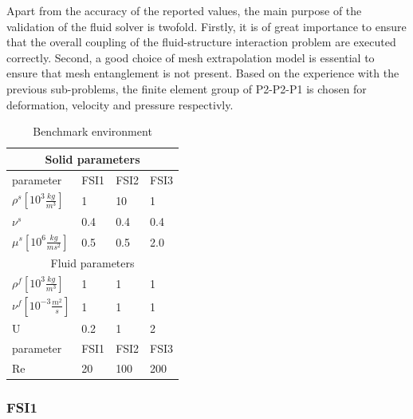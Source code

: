 Apart from the accuracy of the reported values, the main purpose of the validation of the fluid solver is twofold. Firstly, it is of great importance to ensure that the overall coupling of the fluid-structure interaction problem are executed correctly. Second, a good choice of mesh extrapolation model is essential to ensure that mesh entanglement is not present. Based on the experience with the previous sub-problems, the finite element group of P2-P2-P1 is chosen for deformation, velocity and pressure respectivly. 


\begin{table}[h!]
\centering
\caption{Benchmark environment}
\label{my-label}
\begin{tabular}{ |p{3cm}||p{2cm}|p{2cm}|p{2cm}|  }
 \hline
 \multicolumn{4}{|c|}{Solid parameters} \\
 \hline
 parameter              & FSI1 & FSI2 & FSI3 \\
 \hline
 $\rho^s [10^{3} \frac{kg}{m^3}]$ & 1    & 10   & 1    \\
$\nu^s$ & 0.4  & 0.4  & 0.4  \\
$\mu^s  [10^{6}\frac{kg}{ms^2}]$  & 0.5  & 0.5  & 2.0  \\
 \hline
 \multicolumn{4}{|c|}{Fluid parameters} \\
 \hline
$\rho^f [10^{3}\frac{kg}{m^3}]$ & 1    & 1    & 1    \\
$\nu^f  [10^{-3}\frac{m^2}{s}]$  & 1    & 1    & 1    \\
U                      & 0.2  & 1    & 2    \\
parameter              & FSI1 & FSI2 & FSI3 \\
Re                     & 20   & 100  & 200 \\
\hline
\end{tabular}
\end{table}

\newpage
\subsubsection{FSI1}


